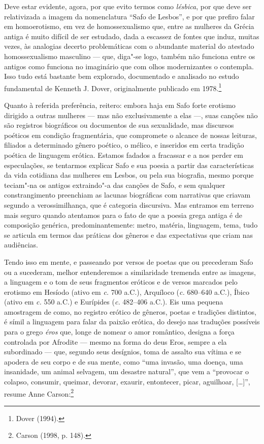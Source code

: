 Deve estar evidente, agora, por que evito termos como
\textit{lésbica}, por que deve ser relativizada a imagem da nomenclatura “Safo
de Lesbos”, e por que prefiro falar em homoerotismo, em vez de homossexualismo
que, entre as mulheres da Grécia antiga é muito difícil de ser estudado, dada a
escassez de fontes que induz, muitas vezes, às analogias decerto problemáticas
com o abundante material do atestado homossexualismo masculino --- que,
diga"-se logo, também não funciona entre os antigos como funciona no imaginário
que com olhos modernizantes o contempla. Isso tudo está bastante
bem explorado, documentado e analisado no estudo fundamental de Kenneth J.
Dover, originalmente publicado em 1978.\footnote{ Dover (1994).}

Quanto à referida preferência, reitero: embora haja em Safo forte erotismo
dirigido a outras mulheres --- mas não exclusivamente a elas ---, suas canções não
são registros biográficos ou documentos de sua sexualidade, mas discursos
poéticos em condição fragmentária, que compromete o alcance de nossas leituras,
filiados a determinado gênero poético, o mélico, e inseridos em certa tradição
poética de linguagem erótica. Estamos fadados a fracassar e a nos perder em
especulações, se tentarmos explicar Safo e sua poesia a partir das
características da vida cotidiana das mulheres em Lesbos, ou pela sua
biografia, mesmo porque teciam"-na os antigos extraindo"-a das canções de Safo, e
sem qualquer constrangimento preenchiam as lacunas biográficas com narrativas
que criavam segundo a verossimilhança, que é categoria discursiva. Mas entramos em terreno mais seguro
quando atentamos para o fato de que a poesia grega antiga é de composição
genérica, predominantemente: metro, matéria, linguagem, tema, tudo se articula
em termos das práticas dos gêneros e das expectativas que criam nas audiências.

Tendo isso em mente, e passeando por versos de poetas que ou precederam Safo ou
a sucederam, melhor entenderemos a similaridade tremenda entre as imagens, a
linguagem e o tom de seus fragmentos eróticos e de versos marcados pelo
erotismo em Hesíodo (ativo em \textit{c.} 700 a.C.), Arquíloco (\textit{c.} 680--640
a.C.), Íbico (ativo em \textit{c.} 550 a.C.) e Eurípides (\textit{c.} 482--406 a.C.). Eis
uma pequena amostragem de como, no registro erótico de gêneros, poetas e
tradições distintos, é símil a linguagem para falar da paixão erótica, do
desejo nas traduções possíveis para o grego \textit{éros} que, longe de nomear
o amor romântico, designa a força controlada por Afrodite --- mesmo na forma do
deus Eros, sempre a ela subordinado --- que, segundo seus desígnios, toma de
assalto sua vítima e se apodera de seu corpo e de sua mente, como “uma invasão,
uma doença, uma insanidade, um animal selvagem, um desastre natural”, que vem a
“provocar o colapso, consumir, queimar, devorar, exaurir, entontecer, picar,
aguilhoar, [\ldots{}]”, resume Anne Carson:\footnote{ Carson (1998, p. 148).}

